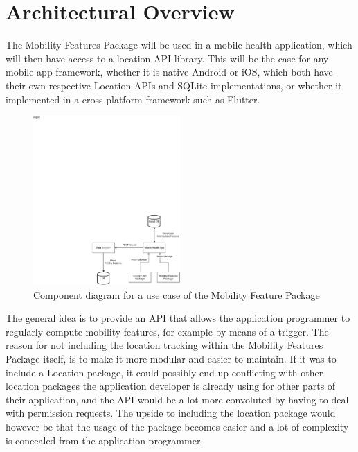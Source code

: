 \section{Architectural Overview}
The Mobility Features Package will be used in a mobile-health application, which will then have access to a location API library. This will be the case for any mobile app framework, whether it is native Android or iOS, which both have their own respective Location APIs and SQLite implementations, or whether it implemented in a cross-platform framework such as Flutter. 


\begin{figure}[h]
    \centering
    \includegraphics[width=0.5\textwidth]{images/component-diagram.pdf}
    \caption{Component diagram for a use case of the Mobility Feature Package}
    \label{fig:component-diagram}
\end{figure}

The general idea is to provide an API that allows the application programmer to regularly compute mobility features, for example by means of a trigger. The reason for not including the location tracking within the Mobility Features Package itself, is to make it more modular and easier to maintain. If it was to include a Location package, it could possibly end up conflicting with other location packages the application developer is already using for other parts of their application, and the API would be a lot more convoluted by having to deal with permission requests. The upside to including the location package would however be that the usage of the package becomes easier and a lot of complexity is concealed from the application programmer. 


